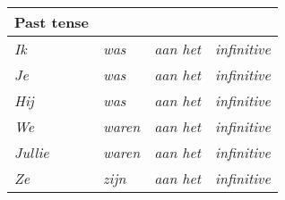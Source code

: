 \documentclass[letterpaper,11pt]{article}
\begin{document}
\begin{tabular}[t]{l l l l}
    \textbf{Past tense} \\
    \hline
    \textit{Ik}     & \textit{was}   & \textit{aan het} & \textit{infinitive} \\
    \textit{Je}     & \textit{was}   & \textit{aan het} & \textit{infinitive} \\
    \textit{Hij}    & \textit{was}   & \textit{aan het} & \textit{infinitive} \\
    \textit{We}     & \textit{waren} & \textit{aan het} & \textit{infinitive} \\
    \textit{Jullie} & \textit{waren} & \textit{aan het} & \textit{infinitive} \\
    \textit{Ze}     & \textit{zijn}  & \textit{aan het} & \textit{infinitive} \\
    \hline
\end{tabular}
\end{document}
